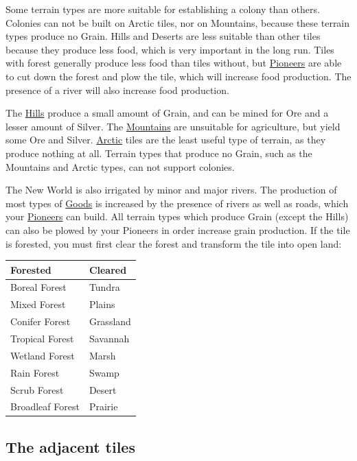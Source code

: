 \documentclass[12pt]{book}
\begin{document}
Some terrain types are more suitable for establishing a colony than
others. Colonies can not be built on Arctic tiles, nor on Mountains,
because these terrain types produce no Grain. Hills and Deserts are
less suitable than other tiles because they produce less food, which
is very important in the long run. Tiles with forest generally produce
less food than tiles without, but \hyperlink{Pioneer}{Pioneers} are
able to cut down the forest and plow the tile, which will increase
food production. The presence of a river will also increase food
production.

The \hyperlink{Hills}{Hills} produce a small amount of Grain, and can
be mined for Ore and a lesser amount of Silver. The
\hyperlink{Mountains}{Mountains} are unsuitable for agriculture, but
yield some Ore and Silver. \hyperlink{Arctic}{Arctic} tiles are the
least useful type of terrain, as they produce nothing at all. Terrain
types that produce no Grain, such as the Mountains and Arctic types,
can not support colonies.

The New World is also irrigated by minor and major rivers. The
production of most types of \hyperlink{Goods}{Goods} is increased by
the presence of rivers as well as roads, which your
\hyperlink{Pioneer}{Pioneers} can build. All terrain types which
produce Grain (except the Hills) can also be plowed by your Pioneers
in order increase grain production. If the tile is forested, you must
first clear the forest and transform the tile into open land:

\vskip5mm
\begin{tabular}{l @{\hskip5mm$\rightarrow$\hskip5mm} l}
Forested&Cleared\\
\hline
Boreal Forest & Tundra\\
Mixed Forest & Plains\\
Conifer Forest & Grassland\\
Tropical Forest & Savannah\\
Wetland Forest & Marsh\\
Rain Forest & Swamp\\
Scrub Forest & Desert\\
Broadleaf Forest & Prairie\\
\end{tabular}
\vskip5mm


\hypertarget{The adjacent tiles}{\subsection{The adjacent tiles}}
\end{document}
